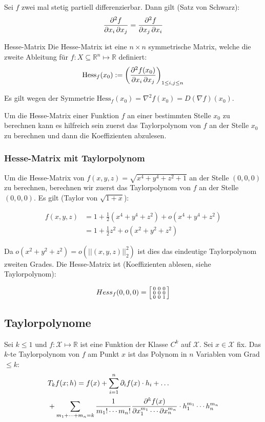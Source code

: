 \documentclass[a4paper,10pt]{article}
\def\R{\mathbb{R}}
\def\X{\mathcal{X}}
\begin{document}
Sei $f$ zwei mal stetig partiell differenzierbar. Dann gilt (Satz von Schwarz):
$$\pdv{f}{x_i, x_j} = \pdv{f}{ x_j, x_i}$$

\begin{mainbox}{Hesse-Matrix}
  Die Hesse-Matrix ist eine \(n \times n\) symmetrische Matrix, welche die zweite Ableitung für $f: X \subseteq \mathbb{R}^n \mapsto \mathbb{R}$ definiert:
  \[\text{Hess}_f(x_0) := \left(\pdv{f(x_0)}{x_i, x_j}\right)_{1\le i,j \le n}\] 
\end{mainbox}

Es gilt wegen der Symmetrie $\text{Hess}_f(x_0) = \nabla^2 f(x_0) = D(\nabla f)(x_0)$.

Um die Hesse-Matrix einer Funktion $f$ an einer bestimmten Stelle $x_0$ zu berechnen kann es hilfreich sein zuerst das Taylorpolynom von $f$ an der Stelle $x_0$ zu berechnen und dann die Koeffizienten abzulesen. 

\subsubsection*{Hesse-Matrix mit Taylorpolynom}

Um die Hesse-Matrix von $f(x, y,z) = \sqrt{x^4 + y^4 + z^2 + 1}$ an der Stelle $(0, 0, 0)$ zu berechnen, berechnen wir zuerst das Taylorpolynom von $f$ an der Stelle $(0, 0, 0)$. Es gilt (Taylor von $\sqrt{1 + x}$):

\begin{align*}
  f(x, y, z) & = 1 + \frac{1}{2}(x^4 + y^4 + z^2) + o(x^4 + y^4 + z^2)\\
  & = 1 + \frac{1}{2}z^2 + o(x^2 + y^2 + z^2)
\end{align*}

Da $o(x^2 + y^2 + z^2) = o(|| (x,y,z) ||_2^2)$ ist dies das eindeutige Taylorpolynom zweiten Grades. Die Hesse-Matrix ist (Koeffizienten ablesen, siehe Taylorpolynom):

$$Hess_f(0, 0, 0) = \begin{bsmallmatrix}
  0 & 0 & 0 \\
  0 & 0 & 0 \\
  0 & 0 & 1
\end{bsmallmatrix}$$

\subsection{Taylorpolynome}
Sei \(k \le 1\) und \(f: \X \mapsto \R\) ist eine Funktion der Klasse \(C^k\) auf \(\X\). Sei \(x \in \X\) fix. Das \(k\)-te Taylorpolynom von \(f\) am Punkt \(x\) ist das Polynom in \(n\) Variablen vom Grad \(\le k\):
\begin{align*}
  &T_k f(x; h) = f(x) + \sum_{i=1}^n \partial_i f(x) \cdot h_i + \dots \\
  &+ \sum_{m_1 + \cdots + m_n = k} \frac{1}{m_1! \cdots m_n!} \pdv{^k f(x) }{x_1^{m_1} \cdots \partial x_n^{m_n}} \cdot h_1^{m_1} \cdots h_n^{m_n}
\end{align*}
\end{document}

